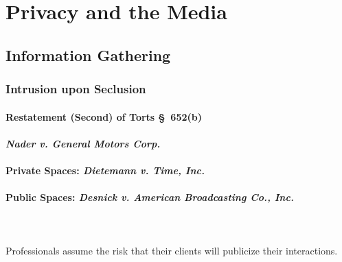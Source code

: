 \section{Privacy and the Media}

\subsection{Information Gathering}

\subsubsection{Intrusion upon Seclusion}

\paragraph{Restatement (Second) of Torts \S\ 652(b)}


\paragraph{\emph{Nader v. General Motors Corp.}}


\paragraph{Private Spaces: \emph{Dietemann v. Time, Inc.}}


\paragraph{Public Spaces: \emph{Desnick v. American Broadcasting Co., Inc.}}
~\\\\
Professionals assume the risk that their clients will publicize their interactions.

